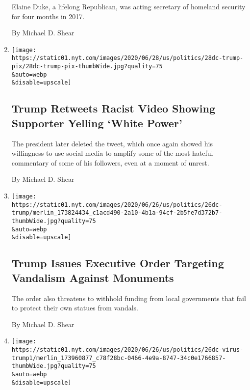 \begin{enumerate}
  Elaine Duke, a lifelong Republican, was acting secretary of homeland
  security for four months in 2017.

  By Michael D. Shear
\item
  \href{/2020/06/28/us/politics/trump-white-power-video-racism.html}{}

  \texttt{[image: https://static01.nyt.com/images/2020/06/28/us/politics/28dc-trump-pix/28dc-trump-pix-thumbWide.jpg?quality=75\\\&auto=webp\\\&disable=upscale]}

  \hypertarget{trump-retweets-racist-video-showing-supporter-yelling-white-power}{%
  \subsection{Trump Retweets Racist Video Showing Supporter Yelling
  `White
  Power'}\label{trump-retweets-racist-video-showing-supporter-yelling-white-power}}

  The president later deleted the tweet, which once again showed his
  willingness to use social media to amplify some of the most hateful
  commentary of some of his followers, even at a moment of unrest.

  By Michael D. Shear
\item
  \href{/2020/06/26/us/politics/trump-monuments-executive-order.html}{}

  \texttt{[image: https://static01.nyt.com/images/2020/06/26/us/politics/26dc-trump/merlin\_173824434\_c1acd490-2a10-4b1a-94cf-2b5fe7d372b7-thumbWide.jpg?quality=75\\\&auto=webp\\\&disable=upscale]}

  \hypertarget{trump-issues-executive-order-targeting-vandalism-against-monuments}{%
  \subsection{Trump Issues Executive Order Targeting Vandalism Against
  Monuments}\label{trump-issues-executive-order-targeting-vandalism-against-monuments}}

  The order also threatens to withhold funding from local governments
  that fail to protect their own statues from vandals.

  By Michael D. Shear
\item
  \href{/2020/06/26/us/politics/trump-coronavirus.html}{}

  \texttt{[image: https://static01.nyt.com/images/2020/06/26/us/politics/26dc-virus-trump1/merlin\_173960877\_c78f28bc-0466-4e9a-8747-34c0e1766857-thumbWide.jpg?quality=75\\\&auto=webp\\\&disable=upscale]}


\end{enumerate}
